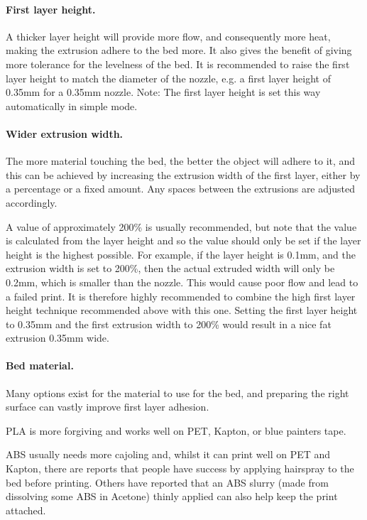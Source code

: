 \paragraph{First layer height.} %
\label{par:first_layer_height}
A thicker layer height will provide more flow, and consequently more heat, making the extrusion adhere to the bed more.  It also gives the benefit of giving more tolerance for the levelness of the bed.  It is recommended to raise the first layer height to match the diameter of the nozzle, e.g. a first layer height of 0.35mm for a 0.35mm nozzle.
Note: The first layer height is set this way automatically in simple mode.

\paragraph{Wider extrusion width.} %
\label{par:wider_extrusion_width}
The more material touching the bed, the better the object will adhere to it, and this can be achieved by increasing the extrusion width of the first layer, either by a percentage or a fixed amount.  Any spaces between the extrusions are adjusted accordingly.

A value of approximately 200\% is usually recommended, but note that the value is calculated from the layer height and so the value should only be set if the layer height is the highest possible.  For example, if the layer height is 0.1mm, and the extrusion width is set to 200\%, then the actual extruded width will only be 0.2mm, which is smaller than the nozzle.   This would cause poor flow and lead to a failed print.  It is therefore highly recommended to combine the high first layer height technique recommended above with this one. Setting the first layer height to 0.35mm and the first extrusion width to 200\% would result in a nice fat extrusion 0.35mm wide.

\paragraph{Bed material.} %
\label{par:bed_material}
Many options exist for the material to use for the bed, and preparing the right surface can vastly improve first layer adhesion.  

PLA is more forgiving and works well on PET, Kapton, or blue painters tape.  

ABS usually needs more cajoling and, whilst it can print well on PET and Kapton, there are reports that people have success by applying hairspray to the bed before printing.  Others have reported that an ABS slurry (made from dissolving some ABS in Acetone) thinly applied can also help keep the print attached.

